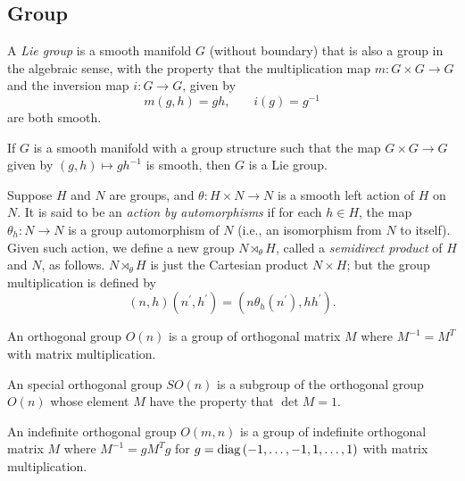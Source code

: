 \documentclass[../main.tex]{subfiles}
\begin{document}
\subsection{Group}
\begin{definition}\label{Group:Lie}
A \textit{Lie group} is a smooth manifold $G$ (without boundary)
that is also a group in the algebraic sense,
with the property that
the multiplication map $m\colon G\times G\to G$
and the inversion map $i\colon G\to G$, given by
\begin{equation*}
m\left(g,h\right)=gh\text{,}
\quad\quad
i\left(g\right)=g^{-1}
\end{equation*}
are both smooth.
\end{definition}
\begin{proposition}\label{Group:Lie:Assertion}
If $G$ is a smooth manifold with a group structure such that the map $G\times G\to G$ given by $\left(g,h\right)\mapsto gh^{-1}$ is smooth, then $G$ is a Lie group.
\end{proposition}
\begin{definition}\label{Group:SemidirectProduct}
Suppose $H$ and $N$ are groups,
and $\theta\colon H\times N\to N$ is a smooth left action of $H$ on $N$.
It is said to be an \textit{action by automorphisms}
if for each $h\in H$, the map $\theta_h\colon N\to N$ is a group automorphism of $N$ (i.e., an isomorphism from $N$ to itself).
Given such action, we define a new group $N\rtimes_\theta H$,
called a \textit{semidirect product} of $H$ and $N$, as follows.
$N\rtimes_\theta H$ is just the Cartesian product $N\times H$;
but the group multiplication is defined by
$$\left(n,h\right)\left(n^\prime,h^\prime\right)=\left(n\theta_h\left(n^\prime\right),hh^\prime\right)\text{.}$$
\end{definition}
\begin{definition}\label{OrthogonalGroup}
An orthogonal group $O\left(n\right)$ is a group of orthogonal matrix $M$ where $M^{-1}=M^T$ with matrix multiplication.
\end{definition}
\begin{definition}\label{SpecialOrthogonalGroup}
An special orthogonal group $SO\left(n\right)$ is a subgroup of the orthogonal group $O\left(n\right)$ whose element $M$ have the property that $\det{M}=1$.
\end{definition}
\begin{definition}\label{IndefiniteOrthogonalGroup}
An indefinite orthogonal group $O\left(m,n\right)$ is a group of indefinite orthogonal matrix $M$ where $M^{-1}=gM^Tg$ for $g=\operatorname{diag}{\left(-1,\dots,-1,1,\dots,1\right)}$ with matrix multiplication.
\end{definition}
\end{document}
